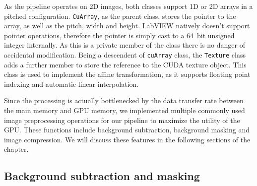   As the pipeline operates on 2D images, both classes support 1D or 2D arrays in a pitched configuration. \texttt{CuArray}, as the parent class, stores the pointer to the array, as well as the pitch, width and height. LabVIEW natively doesn't support pointer operations, therefore the pointer is simply cast to a \SI{64}{bit} unsigned integer internally. As this is a private member of the class there is no danger of accidental modification. Being a descendent of \texttt{cuArray} class, the \texttt{Texture} class adds a further member to store the reference to the CUDA texture object. This class is used to implement the affine transformation, as it supports floating point indexing and automatic linear interpolation.

  Since the processing is actually bottlenecked by the data transfer rate between the main memory and GPU memory, we implemented multiple commonly used image preprocessing operations for our pipeline to maximize the utility of the GPU. These functions include background subtraction, background masking and image compression. We will discuss these features in the following sections of the chapter. 


  \subsection{Background subtraction and masking}
  
